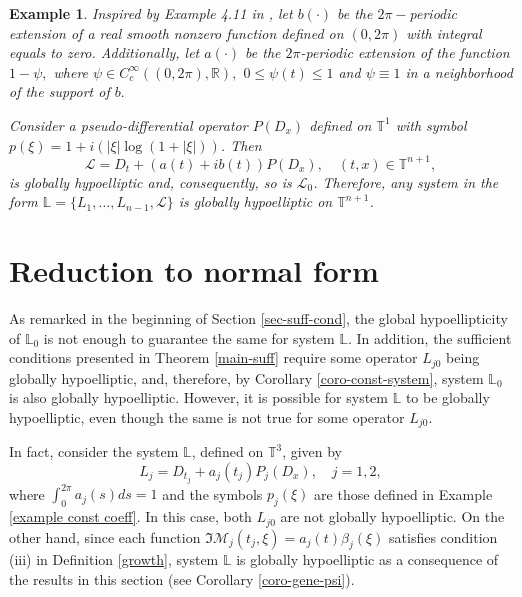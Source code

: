 \documentclass[12pt]{elsarticle}
\newtheorem{example}[theorem]{Example}
\numberwithin{equation}{section}
\begin{document}
\begin{example}
	Inspired by Example 4.11 in  \cite{AGKM}, let $b(\cdot)$ be the $2\pi-$periodic extension of a real smooth nonzero function defined on $(0,2\pi)$ with integral equals to zero. Additionally, let $a(\cdot)$ be the $2\pi$-periodic extension of the function $1-\psi,$ where $\psi\in C^\infty_c((0,2\pi),\mathbb{R}),$ $0\leq \psi(t)\leq 1$ and $\psi\equiv1$ in a neighborhood of  the support of $b.$
	
	Consider a pseudo-differential operator $P(D_x)$ defined on $\mathbb{T}^1$ with symbol $p(\xi)=1+i(|\xi| \log(1 + |\xi|))$. Then
	\begin{equation*}
	\mathcal{L}=D_t +(a(t)+ib(t))P(D_x), \quad  (t,x)\in \mathbb{T}^{n+1},
	\end{equation*}
	is globally hypoelliptic and, consequently, so is  $\mathcal{L}_0$. Therefore, any system in the form $\mathbb{L}=\{L_1, \ldots, L_{n-1}, \mathcal{L}\}$  is globally hypoelliptic on $\mathbb{T}^{n+1}$.
\end{example}





\section{Reduction to normal form \label{sec-reduction}}


As remarked in the beginning of Section \ref{sec-suff-cond}, the global hypoellipticity of $\mathbb{L}_0$ is not enough  to guarantee the same for system $\mathbb{L}$. In addition, the sufficient conditions presented in Theorem \ref{main-suff} require some operator $L_{j0}$ being globally hypoelliptic, and, therefore, by Corollary \ref{coro-const-system},  system $\mathbb{L}_0$ is also globally hypoelliptic. However, it is possible for  system $\mathbb{L}$ to be globally hypoelliptic, even though the same is not true for some operator $L_{j0}$. 


In fact, consider the system $\mathbb{L}$, defined on $\mathbb{T}^3$, given by
$$
L_j = D_{t_j} + a_j(t_j) P_j(D_x), \quad j=1,2, 
$$
where $\int_{0}^{2\pi}a_j(s)ds=1$ and the symbols $p_j(\xi)$ are those defined in Example \ref{example const coeff}. In this case, both $L_{j0}$ are not  globally hypoelliptic. On the other hand, since each function $\Im\mathcal{M}_j(t_j,\xi)=a_j(t)\beta_j(\xi)$ satisfies condition (iii) in Definition \ref{growth}, system $\mathbb{L}$ is globally hypoelliptic as a consequence of the results in this section (see Corollary \ref{coro-gene-psi}). 
\end{document}
